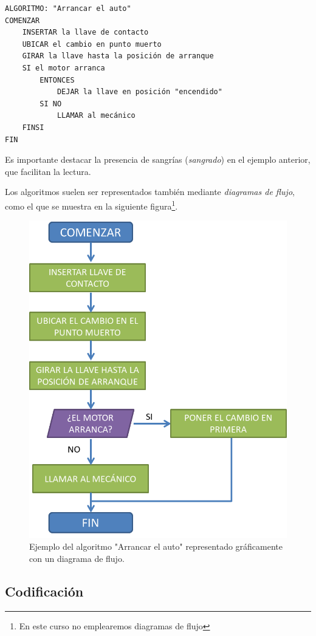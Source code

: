 \documentclass[
]{book}
\begin{document}
\begin{verbatim}
ALGORITMO: "Arrancar el auto"
COMENZAR
    INSERTAR la llave de contacto
    UBICAR el cambio en punto muerto
    GIRAR la llave hasta la posición de arranque
    SI el motor arranca 
        ENTONCES
            DEJAR la llave en posición "encendido"
        SI NO
            LLAMAR al mecánico
    FINSI
FIN
\end{verbatim}

Es importante destacar la presencia de sangrías (\emph{sangrado}) en el ejemplo anterior, que facilitan la lectura.

Los algoritmos suelen ser representados también mediante \emph{diagramas de flujo}, como el que se muestra en la siguiente figura\footnote{En este curso no emplearemos diagramas de flujo}.

\begin{figure}

{\centering \includegraphics[width=0.7\linewidth]{images/intro/flujo} 

}

\caption{Ejemplo del algoritmo "Arrancar el auto" representado gráficamente con un diagrama de flujo.}\label{fig:algoritmo}
\end{figure}

\hypertarget{codificaciuxf3n}{%
\subsection{Codificación}\label{codificaciuxf3n}}
\end{document}
